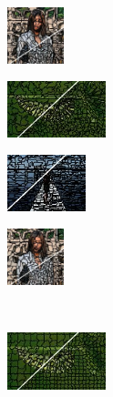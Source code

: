 \begin{figure}
\begin{subfigure}[b]{0.10\textwidth}
		\includegraphics[height=1.65cm]{pictures/fash/crs/cropped/crs_010_contours}
	\end{subfigure}
	\begin{subfigure}[b]{0.02\textwidth}
	\end{subfigure}
	\begin{subfigure}[b]{0.16\textwidth}
		\includegraphics[height=1.65cm]{pictures/bsds500/ers/cropped/ers_35028_contours}
	\end{subfigure}
	\begin{subfigure}[b]{0.129\textwidth}
		\includegraphics[height=1.65cm]{pictures/sbd/ers/cropped/ers_0004774_contours}
	\end{subfigure}
	\begin{subfigure}[b]{0.10\textwidth}
		\includegraphics[height=1.65cm]{pictures/fash/ers/cropped/ers_010_contours}
	\end{subfigure}\\
	\begin{subfigure}[b]{0.02\textwidth}
	\end{subfigure}
	\begin{subfigure}[b]{0.16\textwidth}
		\includegraphics[height=1.65cm]{pictures/bsds500/pb/cropped/pb_35028_contours}
	\end{subfigure}

\end{figure}
